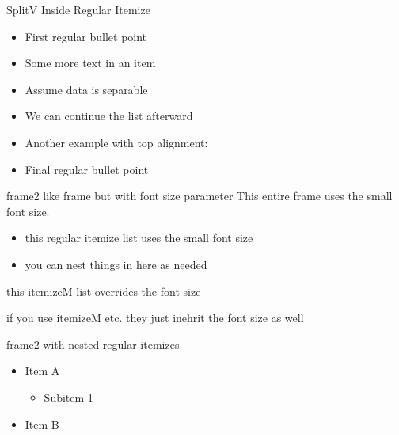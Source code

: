 \documentclass[11pt,compress,t,notes=noshow, xcolor=table]{beamer}
\begin{document}
\begin{frame}{SplitV Inside Regular Itemize}
  \begin{itemize}
    \item First regular bullet point
    
    \item Some more text in an item
    
    \item Assume data is separable
    \item We can continue the list afterward
    
    \item Another example with top alignment:
    
    \item Final regular bullet point
  \end{itemize}
\end{frame}


\begin{frame2}[small]{frame2 like frame but with font size parameter}
  This entire frame uses the small font size.
  
  \begin{itemize}
    \item this regular itemize list uses the small font size
    \item you can nest things in here as needed
  \end{itemize}
  \begin{itemizeM}[large]
    \item this itemizeM list overrides the font size
    \item if you use itemizeM etc. they just inehrit the font size as well
  \end{itemizeM}
\end{frame2}


\begin{frame2}[tiny]{frame2 with nested regular itemizes}
  \begin{itemize}
    \item Item A
    \begin{itemize}
      \item Subitem 1
    \end{itemize}
    \item Item B
  \end{itemize}
\end{frame2}
\end{document}
